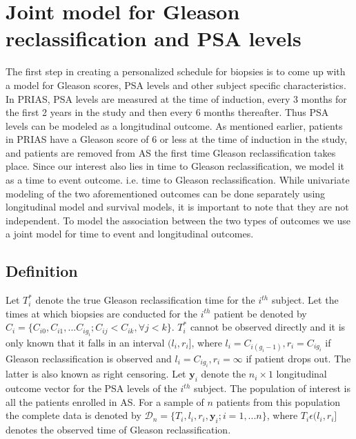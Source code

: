 
\section{Joint model for Gleason reclassification and PSA levels}
\label{sec : jm_introduction}
The first step in creating a personalized schedule for biopsies is to come up with a model for Gleason scores, PSA levels and other subject specific characteristics. In PRIAS, PSA levels are measured at the time of induction, every 3 months for the first 2 years in the study and then every 6 months thereafter. Thus PSA levels can be modeled as a longitudinal outcome. As mentioned earlier, patients in PRIAS have a Gleason score of 6 or less at the time of induction in the study, and patients are removed from AS the first time Gleason reclassification takes place. Since our interest also lies in time to Gleason reclassification, we model it as a time to event outcome. i.e. time to Gleason reclassification. While univariate modeling of the two aforementioned outcomes can be done separately using longitudinal model and survival models, it is important to note that they are not independent. To model the association between the two types of outcomes we use a joint model for time to event and longitudinal outcomes.

\subsection{Definition}
Let $T_i^*$ denote the true Gleason reclassification time for the $i^{th}$ subject. Let the times at which biopsies are conducted for the $i^{th}$ patient be denoted by $C_i = \{C_{i0}, C_{i1}, ... C_{ig_i}; C_{ij} < C_{ik}, \forall j<k \}$. $T_i^*$ cannot be observed directly and it is only known that it falls in an interval $(l_i, r_i]$, where $l_i = C_{i(g_i-1)}, r_i = C_{ig_i}$ if Gleason reclassification is observed and $l_i = C_{ig_i}, r_i=\infty$ if patient drops out. The latter is also known as right censoring. Let $\boldsymbol{y}_i$ denote the $n_i \times 1$ longitudinal outcome vector for the PSA levels of the $i^{th}$ subject. The population of interest is all the patients enrolled in AS. For a sample of $n$ patients from this population the complete data is denoted by $\mathcal{D}_n = \{T_i, l_i, r_i, \boldsymbol{y}_i; i = 1,...n\}$, where $T_i \epsilon (l_i, r_i]$ denotes the observed time of Gleason reclassification.\\

